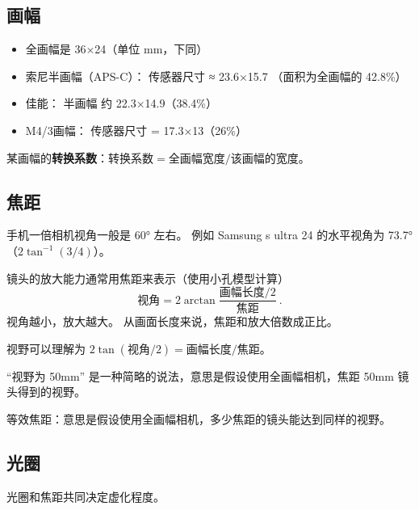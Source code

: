 
\subsection{画幅}
\begin{itemize}
\item 全画幅是 36×24（单位 mm，下同）
\item 索尼半画幅（APS-C）： 传感器尺寸 ≈ 23.6×15.7 （面积为全画幅的 42.8\%）
\item 佳能： 半画幅 约 22.3×14.9（38.4\%）
\item M4/3画幅： 传感器尺寸 = 17.3×13（26\%）
\end{itemize}

某画幅的\textbf{转换系数}：$\text{转换系数} = \text{全画幅宽度}/\text{该画幅的宽度}$。

\subsection{焦距}
手机一倍相机视角一般是 60° 左右。 例如 Samsung s ultra 24 的水平视角为 73.7°（$2\tan^{-1}(3/4)$）。

镜头的放大能力通常用焦距来表示（使用小孔模型计算）
\begin{equation}
\text{视角} = 2\arctan{\frac{\text{画幅长度/2}}{\text{焦距}}}~.
\end{equation}
视角越小，放大越大。 从画面长度来说，焦距和放大倍数成正比。

视野可以理解为 $2\tan(\text{视角}/2) = \text{画幅长度}/{\text{焦距}}$。

“视野为 50mm” 是一种简略的说法，意思是假设使用全画幅相机，焦距 50mm 镜头得到的视野。

等效焦距：意思是假设使用全画幅相机，多少焦距的镜头能达到同样的视野。

\subsection{光圈}
光圈和焦距共同决定虚化程度。
